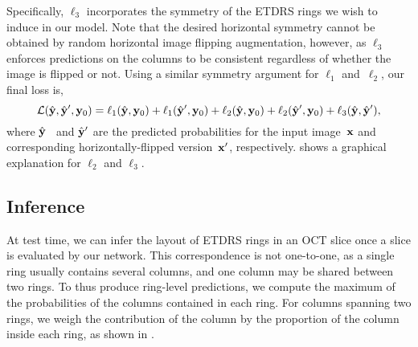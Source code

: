 Specifically, $\ell_3$ incorporates the symmetry of the ETDRS rings we wish to induce in our model. Note that the desired horizontal symmetry cannot be obtained by random horizontal image flipping augmentation, however, as $\ell_3$ enforces predictions on the columns to be consistent regardless of whether the image is flipped or not.
Using a similar symmetry argument for $\ell_1$ and~$\ell_2$, our final loss is,
\begin{equation}
\label{eq:combinedLoss}
    \mathcal{L}(\hat{\mathbf{y}}, \hat{\mathbf{y}}', \mathbf{y}_0) =
        \ell_1(\hat{\mathbf{y}}, \mathbf{y}_0) + \ell_1(\hat{\mathbf{y}}', \mathbf{y}_0) + \ell_2(\hat{\mathbf{y}}, \mathbf{y}_0) + \ell_2(\hat{\mathbf{y}}', \mathbf{y}_0) + \ell_3(\hat{\mathbf{y}}, \hat{\mathbf{y}}'),
\end{equation}
where $\hat{\mathbf{y}}$~ and $\hat{\mathbf{y}}'$ are the predicted probabilities for the input image~$\mathbf{x}$ and corresponding horizontally-flipped version~$\mathbf{x}'$, respectively.  shows a graphical explanation for $\ell_2$ and $\ell_3$.



\subsection{Inference}
At test time, we can infer the layout of ETDRS rings in an OCT slice once a slice is evaluated by our network. This correspondence is not one-to-one, as a single ring usually contains several columns, and one column may be shared between two rings. To thus produce ring-level predictions, we compute the maximum of the probabilities of the columns contained in each ring. For columns spanning two rings, we weigh the contribution of the column by the proportion of the column inside each ring, as shown in .

